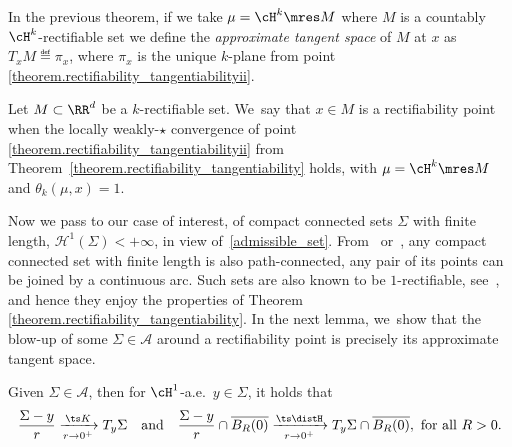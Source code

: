 In the previous theorem, if we take $\mu = \cH^k\mres M$ where $M$ is a countably $\cH^k$\nobreakdash-rectifiable set we define the \emph{approximate tangent space} of $M$ at $x$ as $T_x M \eqdef \pi_x$, where $\pi_x$ is the unique $k$-plane from point \eqref{theorem.rectifiability_tangentiabilityii}.

\begin{definition}\label{definiton.rectifiability_point}
Let $M\subset \RR^d$ be a $k$-rectifiable set. We~say that $x \in M$ is a rectifiability point when the locally weakly-$\star$ convergence of point \eqref{theorem.rectifiability_tangentiabilityii} from Theorem~\ref{theorem.rectifiability_tangentiability} holds, with $\mu = \cH^k\mres M$ and $\theta_k(\mu,x)=1$.
\end{definition}

Now we pass to our case of interest, of compact connected sets $\Sigma$ with finite length, $\mathcal{H}^1(\Sigma) < +\infty$, in view of~\eqref{admissible_set}. From~\cite[Prop.\,30.1 \& Cor.\,30.2]{david2006singular} or~\cite[Th.\,4.4]{alberti2017structure}, any compact connected set with finite length is also path-connected, \ie any pair of its points can be joined by a continuous arc. Such sets are also known to be $1$-rectifiable, see~\cite[Th.\,4.4.8]{ambrosio2004topics}, and hence they enjoy the properties of Theorem \ref{theorem.rectifiability_tangentiability}. In the next lemma, we~show that the blow-up of some $\Sigma \in \mathcal{A}$ around a rectifiability point is precisely its approximate tangent space.

\begin{lemma}\label{lemma.blowup_domain_measure}
Given $\Sigma \in \mathcal{A}$, then for $\cH^1$-a.e.\ $y \in \Sigma$, it holds that
\[
\frac{\Sigma - y}{r} \xrightarrow[r \to 0^+]{\ts K} T_y\Sigma
\quad \text{and} \quad
\frac{\Sigma - y}{r}\cap \overline{B_R(0)} \xrightarrow[r \to 0^+]{\ts\distH} T_y\Sigma\cap \overline{B_R(0)}, \text{ for all $R>0$.}
\]
\end{lemma}

